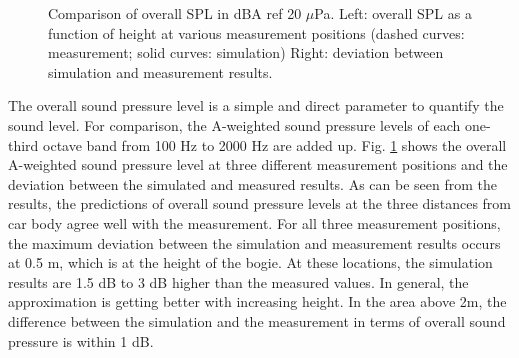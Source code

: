 \begin{figure}[H]
\begin{subfigure}[b]{0.49\textwidth}
	\end{subfigure}
	\caption{Comparison of overall SPL in dBA ref 20 $\mu$Pa. Left: overall SPL as a function of height at various measurement positions (dashed curves: measurement; solid curves: simulation) Right: deviation between simulation and measurement results.}
	\label{fig:overall_SPL}
\end{figure}

\noindent The overall sound pressure level is a simple and direct parameter to quantify the sound level. For comparison, the A-weighted sound pressure levels of each one-third octave band from 100 Hz to 2000 Hz are added up. Fig. \ref{fig:overall_SPL} shows the overall A-weighted sound pressure level at three different measurement positions and the deviation between the simulated and measured results. As can be seen from the results, the predictions of overall sound pressure levels at the three distances from car body agree well with the measurement. For all three measurement positions, the maximum deviation between the simulation and measurement results occurs at 0.5 m, which is at the height of the bogie. At these locations, the simulation results are 1.5 dB to 3 dB higher than the measured values. In general, the approximation is getting better with increasing height. In the area above 2m, the difference between the simulation and the measurement in terms of overall sound pressure is within 1 dB.

